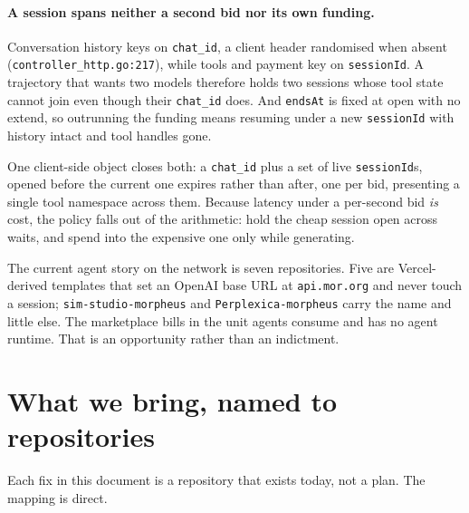 \documentclass[11pt,a4paper]{article}
\newcommand{\code}[1]{\texttt{\small #1}}
\begin{document}
\paragraph{A session spans neither a second bid nor its own funding.}
Conversation history keys on \code{chat\_id}, a client header randomised when
absent (\code{controller\_http.go:217}), while tools and payment key on
\code{sessionId}. A trajectory that wants two models therefore holds two
sessions whose tool state cannot join even though their \code{chat\_id} does.
And \code{endsAt} is fixed at open with no extend, so outrunning the funding
means resuming under a new \code{sessionId} with history intact and tool handles
gone.

One client-side object closes both: a \code{chat\_id} plus a set of live
\code{sessionId}s, opened before the current one expires rather than after, one
per bid, presenting a single tool namespace across them. Because latency under a
per-second bid \emph{is} cost, the policy falls out of the arithmetic: hold the
cheap session open across waits, and spend into the expensive one only while
generating.

The current agent story on the network is seven repositories. Five are
Vercel-derived templates that set an OpenAI base URL at \code{api.mor.org} and
never touch a session; \code{sim-studio-morpheus} and \code{Perplexica-morpheus}
carry the name and little else. The marketplace bills in the unit agents
consume and has no agent runtime. That is an opportunity rather than an
indictment.

\section{What we bring, named to repositories}
\label{sec:bring}

Each fix in this document is a repository that exists today, not a plan. The
mapping is direct.
\end{document}
